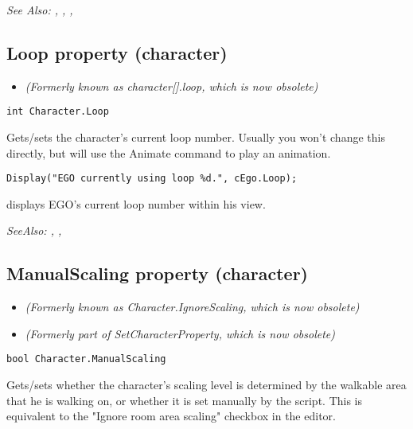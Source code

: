 \it{See Also:} ,
,
,


\subsection{Loop property (character)}\label{Character.Loop}%

\begin{itemize}
\item \it{(Formerly known as character[].loop, which is now obsolete)}
\end{itemize}

\begin{verbatim}
int Character.Loop
\end{verbatim}
Gets/sets the character's current loop number. Usually you won't change this
directly, but will use the Animate command to play an animation.

\begin{verbatim}
Display("EGO currently using loop %d.", cEgo.Loop);
\end{verbatim}
displays EGO's current loop number within his view.

\it{SeeAlso:} ,
,


\subsection{ManualScaling property (character)}\label{Character.ManualScaling}%

\begin{itemize}
\item \it{(Formerly known as Character.IgnoreScaling, which is now obsolete)}
\item \it{(Formerly part of SetCharacterProperty, which is now obsolete)}
\end{itemize}

\begin{verbatim}
bool Character.ManualScaling
\end{verbatim}
Gets/sets whether the character's scaling level is determined by the walkable area that
he is walking on, or whether it is set manually by the script. This is equivalent
to the "Ignore room area scaling" checkbox in the editor.

